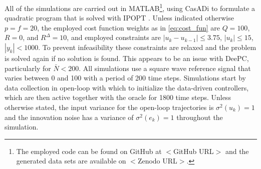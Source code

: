 All of the simulations are carried out in MATLAB\footnote{The employed code can be found on GitHub at $<$GitHub URL$>$ and the generated data sets are available on $<$Zenodo URL$>$.}, using CasADi \citep{Andersson2019} to formulate a quadratic program that is solved with IPOPT \citep{Wachter2006}. Unless indicated otherwise $p=f=20$, the employed cost function weights as in \eqref{eq:cost_fun} are $Q=100$, $R=0$, and $R^\Delta=10$, and employed constraints are $|u_k-u_{k-1}|\leq3.75$, $|u_k|\leq15$, $|y_k|<1000$. To prevent infeasibility these constraints are relaxed and the problem is solved again if no solution is found. This appears to be an issue with \ac{DeePC}, particularly for $\bar{N}<200$. All simulations use a square wave reference signal that varies between 0 and 100 with a period of 200 time steps. Simulations start by data collection in open-loop with which to initialize the data-driven controllers, which are then active together with the oracle for 1800 time steps. Unless otherwise stated, the input variance for the open-loop trajectories is $\sigma^2(u_k)=1$ and the innovation noise has a variance of $\sigma^2(e_k)=1$ throughout the simulation.
